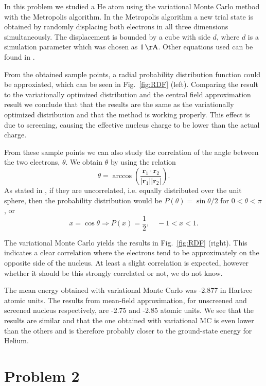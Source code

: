 In this problem we studied a He atom using the variational Monte Carlo method with the Metropolis algorithm. In the Metropolis algorithm a new trial state is obtained by randomly displacing both electrons in all three dimensions simultaneously. The displacement is bounded by a cube with side $d$, where $d$ is a simulation parameter which was chosen as $\unit[1]{\AA}$. Other equations used can be found in \cite{probdesc}.

From the obtained sample points, a radial probability distribution function could be approxiated, which can be seen in Fig.~\ref{fig:RDF} (left). Comparing the result to the variationally optimized distribution and the central field approximation result we conclude that that the results are the same as the variationally optimized distribution and that the method is working properly. This effect is due to screening, causing the effective nucleus charge to be lower than the actual charge.

From these sample points we can also study the correlation of the angle between the two electrons, $\theta$. We obtain $\theta$ by using the relation
\begin{equation}
\theta = \arccos \left( \frac{\mathbf{r}_1 \cdot \mathbf{r}_2}{|\mathbf{r}_1| |\mathbf{r}_2|} \right).
\end{equation}
As stated in \cite{probdesc}, if they are uncorrelated, i.e. equally distributed over the unit sphere, then the probability distribution would be $P(\theta) = \sin \theta / 2$ for $0 < \theta < \pi$, or
\begin{equation}
	x = \cos \theta \Rightarrow P(x) = \frac{1}{2},\quad -1 < x < 1.
\end{equation}

The variational Monte Carlo yields the results in Fig.~\ref{fig:RDF} (right). This indicates a clear correlation where the electrons tend to be approximately on the opposite side of the nucleus. At least a slight correlation is expected, however whether it should be this strongly correlated or not, we do not know.

The mean energy obtained with variational Monte Carlo was -2.877 in Hartree atomic units. The results from mean-field approximation, for unscreened and screened nucleus respectively, are -2.75 and -2.85 atomic units. We see that the results are similar and that the one obtained with variational MC is even lower than the others and is therefore probably closer to the ground-state energy for Helium.


\section*{Problem 2}

